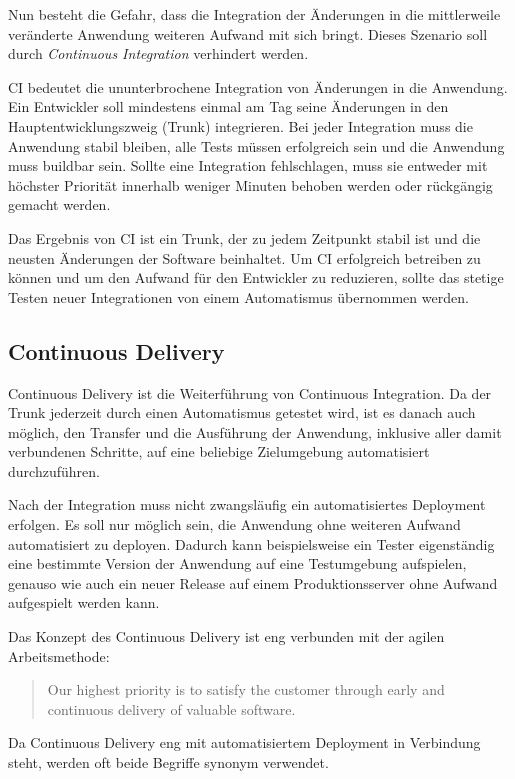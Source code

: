 Nun besteht die Gefahr, dass die Integration der Änderungen in die mittlerweile veränderte Anwendung weiteren Aufwand mit sich bringt. Dieses Szenario soll durch \emph{Continuous Integration} verhindert werden.

\ac{CI} bedeutet die ununterbrochene Integration von Änderungen in die Anwendung. Ein Entwickler soll mindestens einmal am Tag seine Änderungen in den Hauptentwicklungszweig (Trunk) integrieren. Bei jeder Integration muss die Anwendung stabil bleiben, alle Tests müssen erfolgreich sein und die Anwendung muss buildbar sein. Sollte eine Integration fehlschlagen, muss sie entweder mit höchster Priorität innerhalb weniger Minuten behoben werden oder rückgängig gemacht werden.

Das Ergebnis von \ac{CI} ist ein Trunk, der zu jedem Zeitpunkt stabil ist und die neusten Änderungen der Software beinhaltet. Um \ac{CI} erfolgreich betreiben zu können und um den Aufwand für den Entwickler zu reduzieren, sollte das stetige Testen neuer Integrationen von einem Automatismus übernommen werden.


\subsection{Continuous Delivery}

Continuous Delivery ist die Weiterführung von Continuous Integration. Da der Trunk jederzeit durch einen Automatismus getestet wird, ist es danach auch möglich, den Transfer und die Ausführung der Anwendung, inklusive aller damit verbundenen Schritte, auf eine beliebige Zielumgebung automatisiert durchzuführen.

Nach der Integration muss nicht zwangsläufig ein automatisiertes Deployment erfolgen. Es soll nur möglich sein, die Anwendung ohne weiteren Aufwand automatisiert zu deployen. Dadurch kann beispielsweise ein Tester eigenständig eine bestimmte Version der Anwendung auf eine Testumgebung aufspielen, genauso wie auch ein neuer Release auf einem Produktionsserver ohne Aufwand aufgespielt werden kann.

Das Konzept des Continuous Delivery ist eng verbunden mit der agilen Arbeitsmethode:

\begin{quote}
  Our highest priority is to satisfy the customer through early and continuous delivery of valuable software.
\end{quote}

Da Continuous Delivery eng mit automatisiertem Deployment in Verbindung steht, werden oft beide Begriffe synonym verwendet.

